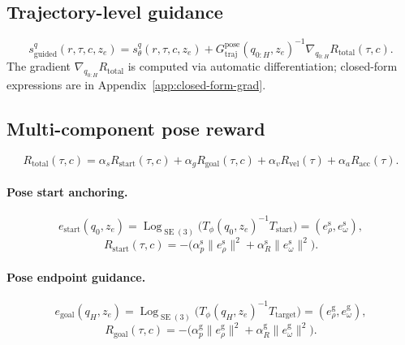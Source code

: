 \documentclass[11pt,a4paper]{article}
\DeclareMathOperator{\Log}{Log}
\DeclareMathOperator{\SE}{SE}
\newcommand{\Tphi}{T_\phi}
\begin{document}
\subsection{Trajectory-level guidance}

\begin{equation}
\boxed{ s_{\text{guided}}^q(r, \tau, c, z_e) = s_\theta^q(r, \tau, c, z_e) + G_{\text{traj}}^{\text{pose}}(q_{0:H}, z_e)^{-1} \nabla_{q_{0:H}} R_{\text{total}}(\tau, c). }
\end{equation}
The gradient $\nabla_{q_{0:H}} R_{\text{total}}$ is computed via automatic differentiation; closed-form expressions are in Appendix~\ref{app:closed-form-grad}.

\subsection{Multi-component pose reward}

\begin{equation}
R_{\text{total}}(\tau, c) = \alpha_s R_{\text{start}}(\tau, c) + \alpha_g R_{\text{goal}}(\tau, c) + \alpha_v R_{\text{vel}}(\tau) + \alpha_a R_{\text{acc}}(\tau).
\end{equation}

\paragraph{Pose start anchoring.}
\begin{equation}
e_{\text{start}}(q_0, z_e) = \Log_{\SE(3)}\!\bigl( \Tphi(q_0, z_e)^{-1} T_{\text{start}} \bigr) = (e_\rho^{\text{s}}, e_\omega^{\text{s}}),
\end{equation}
\begin{equation}
R_{\text{start}}(\tau, c) = -\bigl( \alpha_p^{\text{s}} \| e_\rho^{\text{s}} \|^2 + \alpha_R^{\text{s}} \| e_\omega^{\text{s}} \|^2 \bigr).
\end{equation}

\paragraph{Pose endpoint guidance.}
\begin{equation}
e_{\text{goal}}(q_H, z_e) = \Log_{\SE(3)}\!\bigl( \Tphi(q_H, z_e)^{-1} T_{\text{target}} \bigr) = (e_\rho^{\text{g}}, e_\omega^{\text{g}}),
\end{equation}
\begin{equation}
R_{\text{goal}}(\tau, c) = -\bigl( \alpha_p^{\text{g}} \| e_\rho^{\text{g}} \|^2 + \alpha_R^{\text{g}} \| e_\omega^{\text{g}} \|^2 \bigr).
\end{equation}
\end{document}
